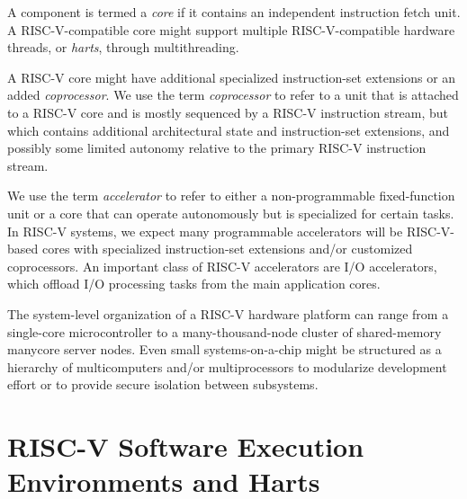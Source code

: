 A component is termed a {\em core} if it contains an independent
instruction fetch unit.  A RISC-V-compatible core might support
multiple RISC-V-compatible hardware threads, or {\em harts}, through
multithreading.

A RISC-V core might have additional specialized instruction-set
extensions or an added {\em coprocessor}.  We use the term {\em
  coprocessor} to refer to a unit that is attached to a RISC-V core
and is mostly sequenced by a RISC-V instruction stream, but which
contains additional architectural state and instruction-set
extensions, and possibly some limited autonomy relative to the
primary RISC-V instruction stream.

We use the term {\em accelerator} to refer to either a
non-programmable fixed-function unit or a core that can operate
autonomously but is specialized for certain tasks.  In RISC-V systems,
we expect many programmable accelerators will be RISC-V-based cores
with specialized instruction-set extensions and/or customized
coprocessors.  An important class of RISC-V accelerators are I/O
accelerators, which offload I/O processing tasks from the main
application cores.

The system-level organization of a RISC-V hardware platform can range
from a single-core microcontroller to a many-thousand-node cluster of
shared-memory manycore server nodes.  Even small systems-on-a-chip
might be structured as a hierarchy of multicomputers and/or
multiprocessors to modularize development effort or to provide secure
isolation between subsystems.

\section{RISC-V Software Execution Environments and Harts}

